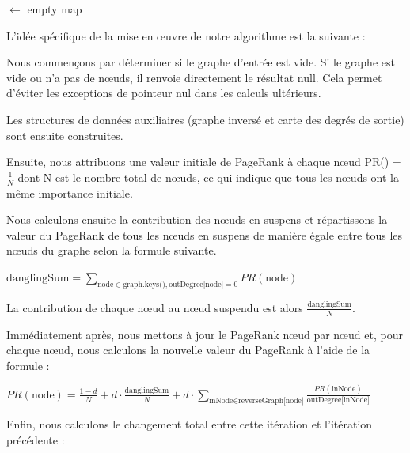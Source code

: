 \documentclass[11pt,english]{article}
\begin{document}
{\begin{algorithm}[H]
        \OutDegreeMap $\gets$ empty map\;
        \Return{\OutDegreeMap}\;
    \end{algorithm}

    \indent

    L'idée spécifique de la mise en œuvre de notre algorithme est la suivante :

    \indent Nous commençons par déterminer si le graphe d'entrée est vide. Si le graphe est vide ou n'a pas de nœuds, il renvoie directement le résultat null. Cela permet d'éviter les exceptions de pointeur nul dans les calculs ultérieurs.

    \indent Les structures de données auxiliaires (graphe inversé et carte des degrés de sortie) sont ensuite construites.

    \indent Ensuite, nous attribuons une valeur initiale de PageRank à chaque nœud PR() = $\frac{1}{N}$ dont N est le nombre total de nœuds, ce qui indique que tous les nœuds ont la même importance initiale.

    \indent Nous calculons ensuite la contribution des nœuds en suspens et répartissons la valeur du PageRank de tous les nœuds en suspens de manière égale entre tous les nœuds du graphe selon la formule suivante.

    \begin{center}
        $\text{danglingSum} = \sum_{\text{node} \in \text{graph.keys()}, \text{outDegree[node]} = 0} PR(\text{node})$
    \end{center}

    \indent La contribution de chaque nœud au nœud suspendu est alors $\frac{\text{danglingSum}}{N}$.

    \indent Immédiatement après, nous mettons à jour le PageRank nœud par nœud et, pour chaque nœud, nous calculons la nouvelle valeur du PageRank à l'aide de la formule :

    \begin{center}
        $PR(\text{node}) = \frac{1 - d}{N} + d \cdot \frac{\text{danglingSum}}{N} 
        + d \cdot \sum_{\text{inNode} \in \text{reverseGraph[node]}} 
        \frac{PR(\text{inNode})}{\text{outDegree[inNode]}}
        $
    \end{center}

    \indent Enfin, nous calculons le changement total entre cette itération et l'itération précédente :
    
}
\end{document}
